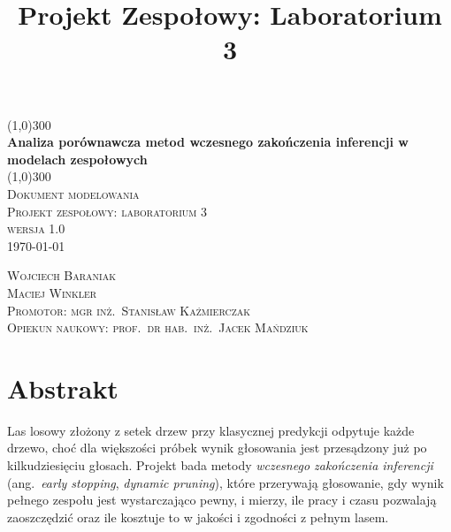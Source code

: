 \documentclass{article}
\title{Projekt Zespołowy: Laboratorium 3}
\begin{document}
\begin{titlepage}
	\begin{center}
    \line(1,0){300}\\
    [0.65cm]
	\huge{\bfseries Analiza porównawcza metod wczesnego zakończenia inferencji w modelach zespołowych}\\
	\line(1,0){300}\\
	\textsc{\Large Dokument modelowania}\\
	\textsc{\Large Projekt zespołowy: laboratorium 3}\\
    \textsc{\Large wersja 1.0}\\
	\textsc{\LARGE \today}\\
	[5.5cm]
	\end{center}
	\begin{flushright}
		\textsc{\Large Wojciech Baraniak}\\
		\textsc{\Large Maciej Winkler}\\
		[1cm]
        \textsc{\Large Promotor: mgr inż.\ Stanisław Kaźmierczak}\\
        \textsc{\Large Opiekun naukowy: prof.\ dr hab.\ inż.\ Jacek Mańdziuk}\\
		[1cm]
	\end{flushright}
\end{titlepage}
\newpage
\tableofcontents

\newpage

\section*{Abstrakt}

Las losowy złożony z setek drzew przy klasycznej predykcji odpytuje każde drzewo, choć
dla większości próbek wynik głosowania jest przesądzony już po kilkudziesięciu głosach.
Projekt bada metody \emph{wczesnego zakończenia inferencji} (ang.\ \emph{early stopping},
\emph{dynamic pruning}), które przerywają głosowanie, gdy wynik pełnego zespołu jest
wystarczająco pewny, i mierzy, ile pracy i czasu pozwalają zaoszczędzić oraz ile kosztuje
to w jakości i zgodności z pełnym lasem.
\end{document}
